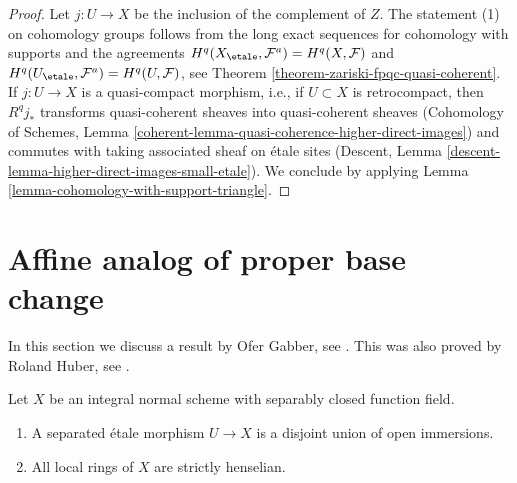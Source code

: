 \begin{proof}
Let $j : U \to X$ be the inclusion of the complement of $Z$.
The statement (1) on cohomology groups follows from the long
exact sequences for cohomology with supports and the agreements
$H^q(X_\etale, \mathcal{F}^a) = H^q(X, \mathcal{F})$ and
$H^q(U_\etale, \mathcal{F}^a) = H^q(U, \mathcal{F})$, see
Theorem \ref{theorem-zariski-fpqc-quasi-coherent}.
If $j : U \to X$ is a quasi-compact morphism, i.e., if $U \subset X$
is retrocompact, then $R^qj_*$ transforms quasi-coherent sheaves
into quasi-coherent sheaves
(Cohomology of Schemes, Lemma
\ref{coherent-lemma-quasi-coherence-higher-direct-images})
and commutes with taking associated
sheaf on \'etale sites
(Descent, Lemma \ref{descent-lemma-higher-direct-images-small-etale}).
We conclude by applying
Lemma \ref{lemma-cohomology-with-support-triangle}.
\end{proof}






\section{Affine analog of proper base change}
\label{section-gabber-affine-proper}

\noindent
In this section we discuss a result by Ofer Gabber, see
\cite{gabber-affine-proper}. This was also proved by Roland Huber, see
\cite{Huber-henselian}.

\begin{lemma}
\label{lemma-normal-scheme-with-alg-closed-function-field}
Let $X$ be an integral normal scheme with separably closed
function field.
\begin{enumerate}
\item A separated \'etale morphism $U \to X$ is a
disjoint union of open immersions.
\item All local rings of $X$ are strictly henselian.
\end{enumerate}
\end{lemma}

